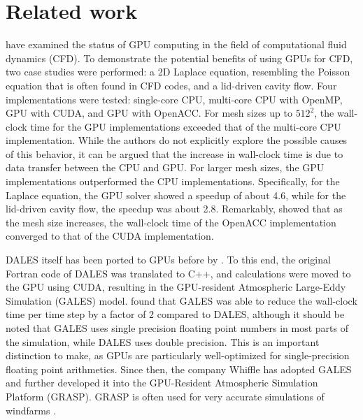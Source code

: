 \section{Related work}
\citet{niemeyerRecentProgressChallenges2014} have examined the status of GPU computing in the field of computational fluid dynamics (CFD). To demonstrate the potential benefits of using GPUs for CFD, two case studies were performed: a 2D Laplace equation, resembling the Poisson equation that is often found in CFD codes, and a lid-driven cavity flow. Four implementations were tested: single-core CPU, multi-core CPU with OpenMP, GPU with CUDA, and GPU with OpenACC. For mesh sizes up to $512^2$, the wall-clock time for the GPU implementations exceeded that of the multi-core CPU implementation. While the authors do not explicitly explore the possible causes of this behavior, it can be argued that the increase in wall-clock time is due to data transfer between the CPU and GPU. For larger mesh sizes, the GPU implementations outperformed the CPU implementations. Specifically, for the Laplace equation, the GPU solver showed a speedup of about 4.6, while for the lid-driven cavity flow, the speedup was about 2.8. Remarkably, \citet{niemeyerRecentProgressChallenges2014} showed that as the mesh size increases, the wall-clock time of the OpenACC implementation converged to that of the CUDA implementation.

DALES itself has been ported to GPUs before by \citet{schalkwijkHighPerformanceSimulationsTurbulent2012}. To this end, the original Fortran code of DALES was translated to C++, and calculations were moved to the GPU using CUDA, resulting in the GPU-resident Atmospheric Large-Eddy Simulation (GALES) model. \citet{schalkwijkHighPerformanceSimulationsTurbulent2012} found that GALES was able to reduce the wall-clock time per time step by a factor of 2 compared to DALES, although it should be noted that GALES uses single precision floating point numbers in most parts of the simulation, while DALES uses double precision. This is an important distinction to make, as GPUs are particularly well-optimized for single-precision floating point arithmetics. Since then, the company Whiffle has adopted GALES and further developed it into the GPU-Resident Atmospheric Simulation Platform (GRASP). GRASP is often used for very accurate simulations of windfarms \citep{verzijlberghAtmosphericFlowsLarge2021}.

